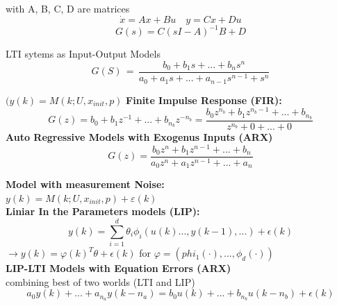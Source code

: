 \begin{tcolorbox}[colback=green!5!white,colframe=green!75!black,title=\textbf{Linear Time Invariant (LTI) Systems}]
with A, B, C, D are matrices
\begin{equation*}
\dot { x } =Ax+Bu \quad y=Cx+Du 
\end{equation*}
\begin{equation*}
G(s)=C{ (sI-A) }^{ -1 }B+D
\end{equation*}

LTI sytems as Input-Output Models
\begin{equation*}
G(S)\, =\, \frac { b_0 + b_1s+...+b_ns^n }{ a_0+a_1s+...+a_{n-1}s^{n-1}+s^n } 
\end{equation*}
\end{tcolorbox}

\begin{tcolorbox}[colback=green!5!white,colframe=green!75!black,title=\textbf{Deterministic Models}]
$(y(k)=M(k;U,{ x }_{ init },p)$
\textbf{Finite Impulse Response (FIR):}
\begin{equation*}
G(z) = b_0 + b_1z^{-1} + ... + b_{n_b}z^{-n_b} = \frac{b_0z^{n_b} + b_1z^{n_b-1} + ... + b_{n_{b}}}{z^{n_b}+0+...+0}
\end{equation*}
\textbf{Auto Regressive Models with Exogenus Inputs (ARX)}
\begin{equation*}
G(z) = \frac{b_0z^n + b_1z^{n-1} + ... + b_n}{a_0z^n + a_1z^{n-1} + ... + a_n}
\end{equation*}
\end{tcolorbox}

\begin{tcolorbox}[colback=green!5!white,colframe=green!75!black,title=\textbf{Stochastik Models}]
\textbf{Model with measurement Noise:} \\ \(y(k)=M(k;U,{ x }_{ init },p)+\varepsilon(k)\) \\
\textbf{Liniar In the Parameters models (LIP):}
\begin{equation*}
y(k) = \sum_{i= 1}^{d}\theta_i\phi_i(u(k)...,y(k-1),...)+\epsilon(k)
\end{equation*}
$\rightarrow y(k) = \varphi(k)^T\theta + \epsilon(k)$ for $\varphi = (phi_1(\cdot),...,\phi_d(\cdot))$ \\
\textbf{LIP-LTI Models with Equation Errors (ARX)}\\
combining best of two worlds (LTI and LIP)
\begin{equation*}
a_0y(k)+...+a_{n_{a}}y(k-n_a) = b_0u(k)+...+b_{n_{b}}u(k-n_b)+\epsilon(k)
\end{equation*}
\end{tcolorbox}

